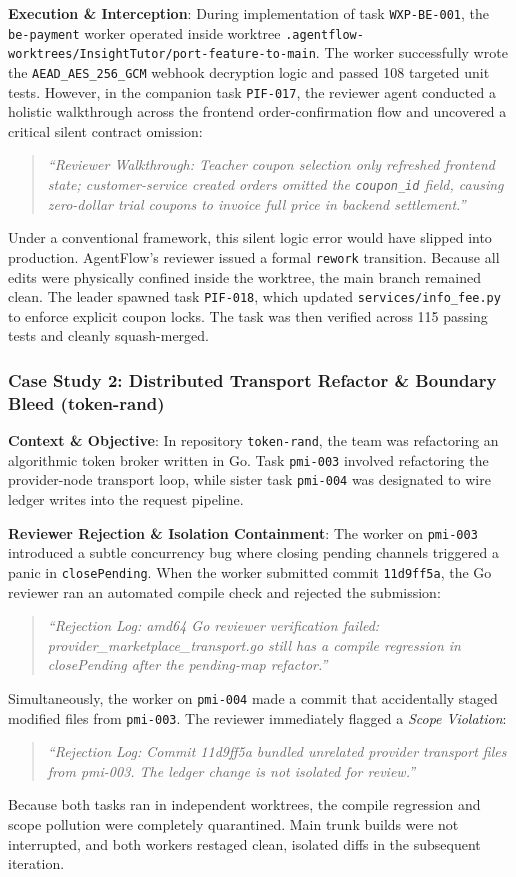 \documentclass[conference]{IEEEtran}
\begin{document}
\textbf{Execution \& Interception}: During implementation of task \texttt{WXP-BE-001}, the \texttt{be-payment} worker operated inside worktree \texttt{.agentflow-worktrees/InsightTutor/port-feature-to-main}. The worker successfully wrote the \texttt{AEAD\_AES\_256\_GCM} webhook decryption logic and passed 108 targeted unit tests. However, in the companion task \texttt{PIF-017}, the reviewer agent conducted a holistic walkthrough across the frontend order-confirmation flow and uncovered a critical silent contract omission:
\begin{quote}
\textit{``Reviewer Walkthrough: Teacher coupon selection only refreshed frontend state; customer-service created orders omitted the \texttt{coupon\_id} field, causing zero-dollar trial coupons to invoice full price in backend settlement.''}
\end{quote}
Under a conventional framework, this silent logic error would have slipped into production. AgentFlow's reviewer issued a formal \texttt{rework} transition. Because all edits were physically confined inside the worktree, the main branch remained clean. The leader spawned task \texttt{PIF-018}, which updated \texttt{services/info\_fee.py} to enforce explicit coupon locks. The task was then verified across 115 passing tests and cleanly squash-merged.

\subsubsection{Case Study 2: Distributed Transport Refactor \& Boundary Bleed (token-rand)}
\textbf{Context \& Objective}: In repository \texttt{token-rand}, the team was refactoring an algorithmic token broker written in Go. Task \texttt{pmi-003} involved refactoring the provider-node transport loop, while sister task \texttt{pmi-004} was designated to wire ledger writes into the request pipeline.

\textbf{Reviewer Rejection \& Isolation Containment}: The worker on \texttt{pmi-003} introduced a subtle concurrency bug where closing pending channels triggered a panic in \texttt{closePending}. When the worker submitted commit \texttt{11d9ff5a}, the Go reviewer ran an automated compile check and rejected the submission:
\begin{quote}
\textit{``Rejection Log: amd64 Go reviewer verification failed: provider\_marketplace\_transport.go still has a compile regression in closePending after the pending-map refactor.''}
\end{quote}
Simultaneously, the worker on \texttt{pmi-004} made a commit that accidentally staged modified files from \texttt{pmi-003}. The reviewer immediately flagged a \textit{Scope Violation}:
\begin{quote}
\textit{``Rejection Log: Commit 11d9ff5a bundled unrelated provider transport files from pmi-003. The ledger change is not isolated for review.''}
\end{quote}
Because both tasks ran in independent worktrees, the compile regression and scope pollution were completely quarantined. Main trunk builds were not interrupted, and both workers restaged clean, isolated diffs in the subsequent iteration.
\end{document}
